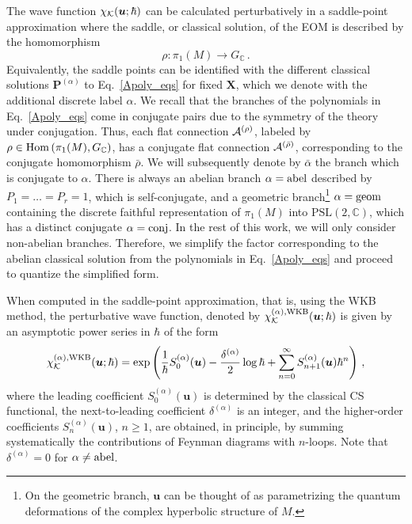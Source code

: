 \documentclass[a4paper,11pt]{article}
\theoremstyle{definition}
\newcommand{\CA}{{\cal A}}
\newcommand{\CK}{{\cal K}}
\def\IC{{\mathbb C}}
\def\Hom{{\rm Hom}}
\newcommand{\be}{\begin{equation}}
\newcommand{\ee}{\end{equation}}
\begin{document}
The wave function $\chi_{\CK}(\bm{u}; \hbar)$ can be calculated perturbatively in a saddle-point approximation where the saddle, or classical solution, of the EOM is described by the homomorphism 
\be
\rho : \pi_1(M) \rightarrow G_{\IC} \, .
\ee
Equivalently, the saddle points can be identified with the different classical solutions $\bm{P}^{(\alpha)}$ to Eq.~\eqref{Apoly_eqs} for fixed $\bm{X}$, which we denote with the additional discrete label $\alpha$. We recall that the branches of the polynomials in Eq.~\eqref{Apoly_eqs} come in conjugate pairs due to the symmetry of the theory under conjugation. Thus, each flat connection $\CA^{(\rho)}$, labeled by $\rho \in \Hom\left(\pi_1(M), G_{\IC} \right)$, has a conjugate flat connection $\CA^{(\bar{\rho})}$, corresponding to the conjugate homomorphism $\bar{\rho}$. We will subsequently denote by $\bar{\alpha}$ the branch which is conjugate to $\alpha$.
%
There is always an abelian branch $\alpha = \rm{abel}$ described by $P_1=\dots=P_r=1$, which is self-conjugate, and a geometric branch\footnote{On the geometric branch, $\bm{u}$ can be thought of as parametrizing the quantum deformations of the complex hyperbolic structure of $M$.} $\alpha = \rm{geom}$ containing the discrete faithful representation of $\pi_1(M)$ into $\text{PSL}(2, \IC)$, which has a distinct conjugate $\alpha = \rm{conj}$. 
In the rest of this work, we will only consider non-abelian branches. Therefore, we simplify the factor corresponding to the abelian classical solution from the polynomials in Eq.~\eqref{Apoly_eqs} and proceed to quantize the simplified form.

When computed in the saddle-point approximation, that is, using the WKB method, the perturbative wave function, denoted by $\chi_{\CK}^{(\alpha), \rm{WKB}}(\bm{u};\hbar)$ is given by an asymptotic power series in $\hbar$ of the form~\cite{dglz}
\be \label{WKB}
 \chi_{\CK}^{(\alpha), \rm{WKB}}(\bm{u};\hbar) = \exp \left( \frac{1}{\hbar} S_0^{(\alpha)}(\bm{u}) - \frac{\delta^{(\alpha)}}{2} \log \hbar + \sum_{n=0}^{\infty} S_{n+1}^{(\alpha)}(\bm{u}) \hbar^n  \right) \, ,
\ee
where the leading coefficient $S_0^{(\alpha)}(\bm{u})$ is determined by the classical CS functional, the next-to-leading coefficient $\delta^{(\alpha)}$ is an integer, and the higher-order coefficients $S_n^{(\alpha)}(\bm{u})$, $n \ge 1$, are obtained, in principle, by summing systematically the contributions of Feynman diagrams with $n$-loops. Note that $\delta^{(\alpha)} = 0$ for $\alpha \ne \rm{abel}$. 
\end{document}
